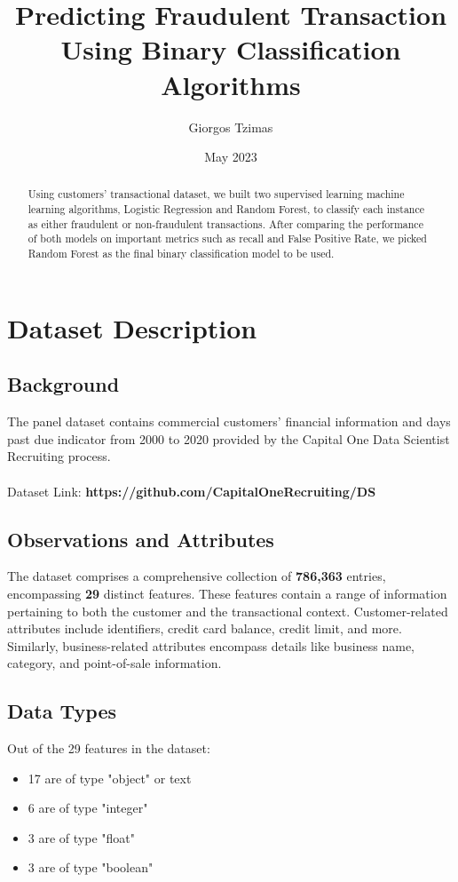 \documentclass[12pt]{article}
\title{Predicting Fraudulent Transaction Using Binary Classification Algorithms}
\author{Giorgos Tzimas}
\date{May 2023}
\begin{document}
\maketitle
\begin{abstract}
    Using customers' transactional dataset, we built two supervised learning machine learning algorithms, Logistic Regression and Random Forest, to classify each instance as either fraudulent or non-fraudulent transactions. After comparing the performance of both models on important metrics such as recall and False Positive Rate, we picked Random Forest as the final binary classification model to be used. 
\end{abstract}

\section{Dataset Description}
\subsection{Background}
The panel dataset contains commercial customers' financial information and days past due indicator from 2000 to 2020 provided by the Capital One Data Scientist Recruiting process. \\ \\
Dataset Link: \textbf{https://github.com/CapitalOneRecruiting/DS}

\subsection{Observations and Attributes}
The dataset comprises a comprehensive collection of \textbf{786,363} entries, encompassing \textbf{29} distinct features. These features contain a range of information pertaining to both the customer and the transactional context. Customer-related attributes include identifiers, credit card balance, credit limit, and more. Similarly, business-related attributes encompass details like business name, category, and point-of-sale information.
\vfill
\subsection{Data Types}
Out of the 29 features in the dataset:
\begin{itemize}
  \item 17 are of type "object" or text
  \item 6 are of type "integer"
  \item 3 are of type "float"
  \item 3 are of type "boolean"
\end{itemize}
\end{document}
